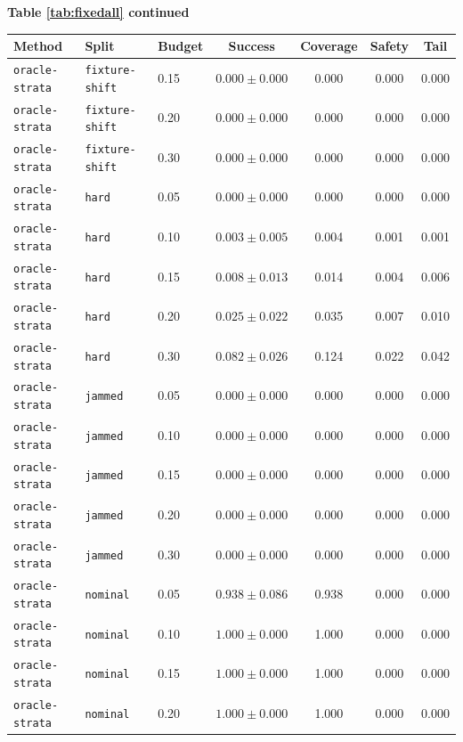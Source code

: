 \documentclass{article}
\begin{document}
\begin{center}
\textbf{Table \ref{tab:fixedall} continued}\\[0.4ex]
\begin{tabular}{lllcccc}
\toprule
Method & Split & Budget & Success & Coverage & Safety & Tail \\
\midrule
\texttt{oracle-strata} & \texttt{fixture-shift} & 0.15 & $0.000 \pm 0.000$ & 0.000 & 0.000 & 0.000 \\
\texttt{oracle-strata} & \texttt{fixture-shift} & 0.20 & $0.000 \pm 0.000$ & 0.000 & 0.000 & 0.000 \\
\texttt{oracle-strata} & \texttt{fixture-shift} & 0.30 & $0.000 \pm 0.000$ & 0.000 & 0.000 & 0.000 \\
\texttt{oracle-strata} & \texttt{hard} & 0.05 & $0.000 \pm 0.000$ & 0.000 & 0.000 & 0.000 \\
\texttt{oracle-strata} & \texttt{hard} & 0.10 & $0.003 \pm 0.005$ & 0.004 & 0.001 & 0.001 \\
\texttt{oracle-strata} & \texttt{hard} & 0.15 & $0.008 \pm 0.013$ & 0.014 & 0.004 & 0.006 \\
\texttt{oracle-strata} & \texttt{hard} & 0.20 & $0.025 \pm 0.022$ & 0.035 & 0.007 & 0.010 \\
\texttt{oracle-strata} & \texttt{hard} & 0.30 & $0.082 \pm 0.026$ & 0.124 & 0.022 & 0.042 \\
\texttt{oracle-strata} & \texttt{jammed} & 0.05 & $0.000 \pm 0.000$ & 0.000 & 0.000 & 0.000 \\
\texttt{oracle-strata} & \texttt{jammed} & 0.10 & $0.000 \pm 0.000$ & 0.000 & 0.000 & 0.000 \\
\texttt{oracle-strata} & \texttt{jammed} & 0.15 & $0.000 \pm 0.000$ & 0.000 & 0.000 & 0.000 \\
\texttt{oracle-strata} & \texttt{jammed} & 0.20 & $0.000 \pm 0.000$ & 0.000 & 0.000 & 0.000 \\
\texttt{oracle-strata} & \texttt{jammed} & 0.30 & $0.000 \pm 0.000$ & 0.000 & 0.000 & 0.000 \\
\texttt{oracle-strata} & \texttt{nominal} & 0.05 & $0.938 \pm 0.086$ & 0.938 & 0.000 & 0.000 \\
\texttt{oracle-strata} & \texttt{nominal} & 0.10 & $1.000 \pm 0.000$ & 1.000 & 0.000 & 0.000 \\
\texttt{oracle-strata} & \texttt{nominal} & 0.15 & $1.000 \pm 0.000$ & 1.000 & 0.000 & 0.000 \\
\texttt{oracle-strata} & \texttt{nominal} & 0.20 & $1.000 \pm 0.000$ & 1.000 & 0.000 & 0.000 \\

\end{tabular}
\end{center}
\end{document}
